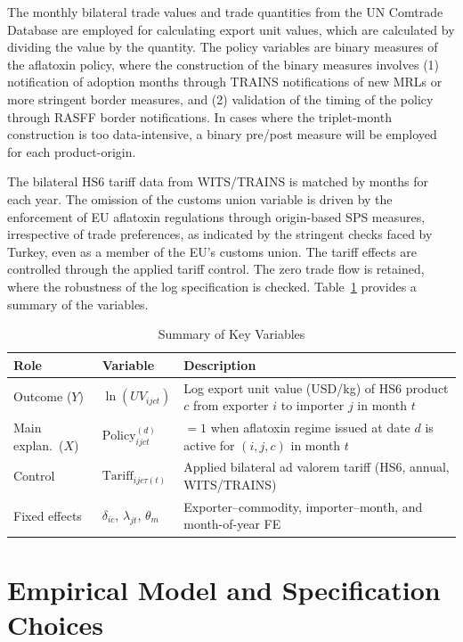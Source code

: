 \documentclass[12pt]{article}
\begin{document}
The monthly bilateral trade values and trade quantities from the UN Comtrade Database are employed for calculating export unit values, which are calculated by dividing the value by the quantity. The policy variables are binary measures of the aflatoxin policy, where the construction of the binary measures involves (1) notification of adoption months through TRAINS notifications of new MRLs or more stringent border measures, and (2) validation of the timing of the policy through RASFF border notifications. In cases where the triplet-month construction is too data-intensive, a binary pre/post measure will be employed for each product-origin.

The bilateral HS6 tariff data from WITS/TRAINS is matched by months for each year. The omission of the customs union variable is driven by the enforcement of EU aflatoxin regulations through origin-based SPS measures, irrespective of trade preferences, as indicated by the stringent checks faced by Turkey, even as a member of the EU’s customs union. The tariff effects are controlled through the applied tariff control. The zero trade flow is retained, where the robustness of the log specification is checked. Table~\ref{tab:variables} provides a summary of the variables.

\begin{table}[h]
\centering
\caption{Summary of Key Variables}
\label{tab:variables}
\begin{tabular}{@{}llp{7.5cm}@{}}
\toprule
\textbf{Role} & \textbf{Variable} & \textbf{Description} \\
\midrule
Outcome ($Y$) & $\ln(UV_{ijct})$ & Log export unit value (USD/kg) of HS6 product $c$ from exporter $i$ to importer $j$ in month $t$ \\[4pt]
Main explan.\ ($X$) & $\text{Policy}_{ijct}^{(d)}$ & $=1$ when aflatoxin regime issued at date $d$ is active for $(i,j,c)$ in month $t$ \\[4pt]
Control & $\text{Tariff}_{ijc\tau(t)}$ & Applied bilateral ad valorem tariff (HS6, annual, WITS/TRAINS) \\[4pt]
Fixed effects & $\delta_{ic}$, $\lambda_{jt}$, $\theta_m$ & Exporter--commodity, importer--month, and month-of-year FE \\[4pt]
\bottomrule
\end{tabular}
\end{table}

\section{Empirical Model and Specification Choices}
\end{document}
